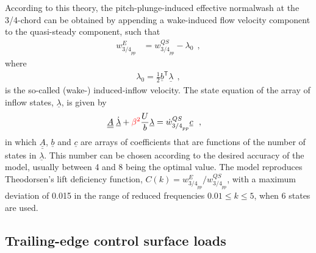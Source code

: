 \documentclass[12pt,a4paper,oneside,english]{abntex2} %
\newcommand{\fix}[1]{{\color{red}#1}}
\newcommand{\vect}[1]{\underline{#1}}
\def\tens#1{\underline{\underline{#1}}}
\def\T{\mathsf{T}}
\begin{document}
According to this theory, the pitch-plunge-induced effective normalwash at the 3/4-chord can be obtained by appending a wake-induced flow velocity component to the quasi-steady component, such that
\begin{align}
    w_{{3/4}_{pp}}^E &= w_{{3/4}_{pp}}^{QS} - \lambda_0 \ \ ,
    \label{eq:w_34_eff_peters}
\end{align}
where 
\begin{align}
    \lambda_0 = \frac{1}{2}\vect{b}^\T\vect{\lambda}
    \ \ , 
    \label{eq:lambda_0}
\end{align}
is the so-called (wake-) induced-inflow velocity. The state equation of the array of inflow states, $\vect{\lambda}$, is given by
\begin{align}
    \tens{A}\;\vect{\dot{\lambda}} + \fix{\beta^2}\frac{U}{b}\vect{\lambda} &= \dot{w}_{{3/4}_{pp}}^{QS} \vect{c} \ \ ,
    \label{eq:lambda_statespace}
\end{align}
in which $\tens{A}$, $\vect{b}$ and $\vect{c}$ are arrays of coefficients \cite{hodges2011introduction} that are functions of the number of states in $\vect{\lambda}$. This number can be chosen according to the desired accuracy of the model, usually between 4 and 8 being the optimal value. \fix{The model reproduces Theodorsen's lift deficiency function, $C(k)=w_{{3/4}_{pp}}^E/w_{{3/4}_{pp}}^{QS}$, with a maximum deviation of 0.015 in the range of reduced frequencies $0.01\leq k\leq5$, when 6 states are used.}

\subsection{Trailing-edge control surface loads}
\label{subsec:flap_loads}
\end{document}
